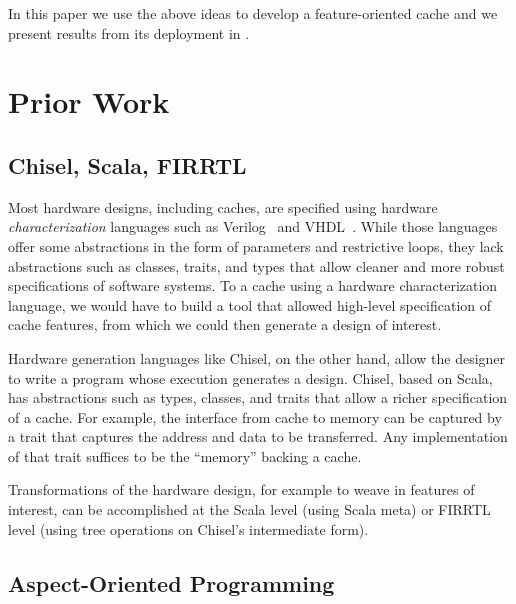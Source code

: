 \documentclass[conference]{IEEEtran}
\begin{document}
In this paper we use the above ideas to develop a feature-oriented cache and we present results from its deployment in \Riscvmini{}.  



\section{Prior Work}

\subsection{Chisel, Scala, FIRRTL}

Most hardware designs, including caches, are specified using hardware \emph{characterization} languages such as Verilog~\cite{verilog} and VHDL~\cite{vhdl}.  While those languages offer some abstractions in the form of parameters and restrictive loops, they lack abstractions such as classes, traits, and types that allow cleaner and more robust specifications of software systems.  To a cache using a hardware characterization language, we would have to build a tool that allowed high-level specification of cache features, from which we could then generate a design of interest.

Hardware generation languages like Chisel, on the other hand, allow the designer to write a program whose execution generates a design.  Chisel, based on Scala, has abstractions such as types, classes, and traits that allow a richer specification of a cache.  For example, the interface from cache to memory can be captured by a trait that captures the address and data to be transferred.  Any implementation of that trait suffices to be the ``memory'' backing a cache.

Transformations of the hardware design, for example to weave in features of interest, can be accomplished at the Scala level (using Scala meta) or FIRRTL level (using tree operations on Chisel's intermediate form).

\subsection{Aspect-Oriented Programming}
\end{document}
